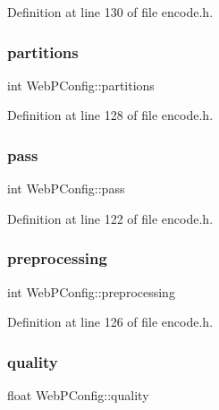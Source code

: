Definition at line 130 of file encode.\+h.

\mbox{\label{struct_web_p_config_aeb79c9c630ea18d5481e9afdf6380d76}} 
\subsubsection{\texorpdfstring{partitions}{partitions}}
{\footnotesize\ttfamily int Web\+P\+Config\+::partitions}



Definition at line 128 of file encode.\+h.

\mbox{\label{struct_web_p_config_a72556386749d24fc3bf8b5f9c869b962}} 
\subsubsection{\texorpdfstring{pass}{pass}}
{\footnotesize\ttfamily int Web\+P\+Config\+::pass}



Definition at line 122 of file encode.\+h.

\mbox{\label{struct_web_p_config_a913a25288e6f81b2918782d2bed979fa}} 
\subsubsection{\texorpdfstring{preprocessing}{preprocessing}}
{\footnotesize\ttfamily int Web\+P\+Config\+::preprocessing}



Definition at line 126 of file encode.\+h.

\mbox{\label{struct_web_p_config_a733ce6ee4f65bd282eaadcbbe2bb1655}} 
\subsubsection{\texorpdfstring{quality}{quality}}
{\footnotesize\ttfamily float Web\+P\+Config\+::quality}



